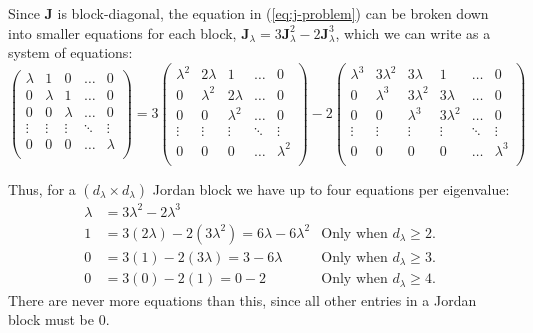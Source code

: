 \documentclass{article}
\theoremstyle{plain}
\theoremstyle{definition}
\theoremstyle{remark}
\newcommand{\vJ}{\mathbf{J}}
\begin{document}
Since $\vJ$ is block-diagonal, the equation in (\ref{eq:j-problem}) can be broken down into smaller equations for each block, $\vJ_{\lambda} = 3\vJ_{\lambda}^2 - 2\vJ_{\lambda}^3$, which we can write as a system of equations:
\begin{equation*}
    \begin{pmatrix}
        \lambda & 1       & 0       & \hdots & 0       \\
        0       & \lambda & 1       & \hdots & 0       \\
        0       & 0       & \lambda & \hdots & 0       \\
        \vdots  & \vdots  & \vdots  & \ddots & \vdots  \\
        0       & 0       & 0       & \hdots & \lambda \\
    \end{pmatrix} = 3\begin{pmatrix}
        \lambda^2 & 2\lambda  & 1         & \hdots & 0         \\
        0         & \lambda^2 & 2\lambda  & \hdots & 0         \\
        0         & 0         & \lambda^2 & \hdots & 0         \\
        \vdots    & \vdots    & \vdots    & \ddots & \vdots    \\
        0         & 0         & 0         & \hdots & \lambda^2 \\
    \end{pmatrix} - 2\begin{pmatrix}
        \lambda^3 & 3\lambda^2 & 3\lambda   & 1          & \hdots & 0         \\
        0         & \lambda^3  & 3\lambda^2 & 3\lambda   & \hdots & 0         \\
        0         & 0          & \lambda^3  & 3\lambda^2 & \hdots & 0         \\
        \vdots    & \vdots     & \vdots     & \vdots     & \ddots & \vdots    \\
        0         & 0          & 0          & 0          & \hdots & \lambda^3 \\
    \end{pmatrix}
\end{equation*}

Thus, for a $(d_\lambda \times d_\lambda)$ Jordan block we have up to four equations per eigenvalue:
\begin{align}
    \lambda & = 3\lambda^2 - 2\lambda^3                             & \label{eq:app-cond1}                                    \\
    1       & = 3(2\lambda) - 2(3\lambda^2) = 6\lambda - 6\lambda^2 & \text{Only when $d_\lambda \geq2$.}\label{eq:app-cond2} \\
    0       & = 3(1) - 2(3\lambda) = 3 - 6\lambda                   & \text{Only when $d_\lambda \geq3$.}\label{eq:app-cond3} \\
    0       & = 3(0) - 2(1) = 0 - 2                                 & \text{Only when $d_\lambda \geq4$.}\label{eq:app-cond4}
\end{align}
There are never more equations than this, since all other entries in a Jordan block must be 0.
\end{document}
